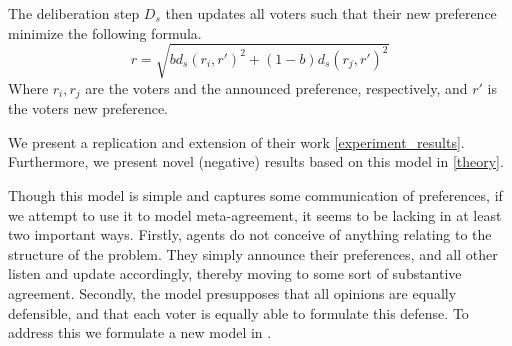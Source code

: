 The deliberation step $D_s$ then updates all voters such that their new preference  minimize the following formula.
\begin{equation}
	r =
	\sqrt{
		b d_s(r_i, r')^2 + (1-b)d_s(r_j, r')^2
	}
	\label{eq:deliberation_step_formula}
\end{equation}
Where $r_i, r_j$ are the voters and the announced preference, respectively, and $r'$ is the voters new preference.

We present a replication and extension of their work \cref{experiment_results}. Furthermore, we present novel (negative) results based on this model in \cref{theory}.

Though this model is simple and captures some communication of preferences, if we attempt to use it to model meta-agreement, it seems to be lacking in at least two important ways. Firstly, agents do not conceive of anything relating to the structure of the problem. They simply announce their preferences, and all other listen and update accordingly, thereby moving to some sort of substantive agreement. Secondly, the model presupposes that all opinions are equally defensible, and that each voter is equally able to formulate this defense. To address this we formulate a new model in .



